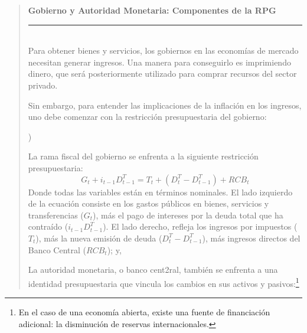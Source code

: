 \documentclass[10pt,a4paper]{article}
\newcounter{alphaitem}
\newenvironment{la}
      {\begin{list}{\alph{alphaitem})}{%
          \usecounter{alphaitem}%
          \setlength{\leftmargin}{1cm}%
          \setlength{\parskip}{3pt}%
          \setlength{\itemsep}{0pt}%
          \setlength{\parsep}{0pt}%
      }}
      {\end{list}}
\newenvironment{specialblock}[1]{%
      \begin{quote} %
      \small %
      \noindent\textbf{#1}\\[-0.3em] %
      \rule{\linewidth}{0.4pt}\\[0.6em]}{
      \end{quote}}
\begin{document}
\begin{specialblock}{Gobierno y Autoridad Monetaria: Componentes de la RPG}
    Para obtener bienes y servicios, los gobiernos en las economías de mercado necesitan generar ingresos. Una manera para conseguirlo es imprimiendo dinero, que será posteriormente utilizado para comprar recursos del sector privado. 
    
    Sin embargo, para entender las implicaciones de la inflación en los ingresos, uno debe comenzar con la restricción presupuestaria del gobierno:
    \begin{la}
        \item La rama fiscal del gobierno se enfrenta a la siguiente restricción presupuestaria: 
        $$G_t+i_{t-1}D_{t-1}^T=T_t+(D_t^T-D_{t-1}^T)+RCB_t$$ 
        Donde todas las variables están en términos nominales. El lado izquierdo de la ecuación consiste en los gastos públicos en bienes, servicios y transferencias ($G_t$), más el pago de intereses por la deuda total que ha contraído ($i_{t-1}D_{t-1}^T$). El lado derecho, refleja los ingresos por impuestos ($T_t$), más la nueva emisión de deuda ($D_t^T-D_{t-1}^T$), más ingresos directos del Banco Central ($RCB_t$); y,
        \item La autoridad monetaria, o banco cent2ral, también se enfrenta a una identidad presupuestaria que vincula los cambios en sus activos y pasivos:\footnote{
        En el caso de una economía abierta, existe una fuente de financiación adicional: la disminución de reservas internacionales. 
        
}
\end{la}
\end{specialblock}
\end{document}
